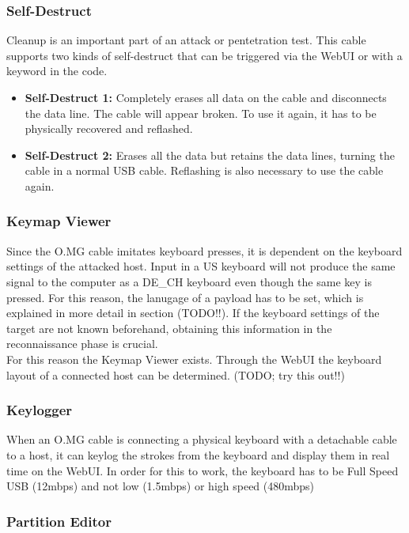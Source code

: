 \subsubsection{Self-Destruct}

Cleanup is an important part of an attack or pentetration test. This cable supports two kinds of self-destruct that can be triggered via the WebUI or with a keyword in the code.
\begin{itemize}
    \item  \textbf{Self-Destruct 1:} Completely erases all data on the cable and disconnects the data line. The cable will appear broken. To use it again, it has to be physically recovered and reflashed.  
    \item  \textbf{Self-Destruct 2:}  Erases all the data but retains the data lines, turning the cable in a normal USB cable. Reflashing is also necessary to use the cable again. 
\end{itemize}


\subsubsection{Keymap Viewer}

Since the O.MG cable imitates keyboard presses, it is dependent on the keyboard settings of the attacked host. Input in a US keyboard will not produce the same signal to the computer as a DE\_CH keyboard even though the same key is pressed. For this reason, the lanugage of a payload has to be set, which is explained in more detail in section (TODO!!). If the keyboard settings of the target are not known beforehand, obtaining this information in the reconnaissance phase is crucial. \\
For this reason the Keymap Viewer exists. Through the WebUI the keyboard layout of a connected host can be determined. (TODO; try this out!!)

\subsubsection{Keylogger}

When an O.MG cable is connecting a physical keyboard with a detachable cable to a host, it can keylog the strokes from the keyboard and display them in real time on the WebUI. In order for this to work, the keyboard has to be Full Speed USB (12mbps) and not low (1.5mbps) or high speed (480mbps) 

\subsubsection{Partition Editor}

